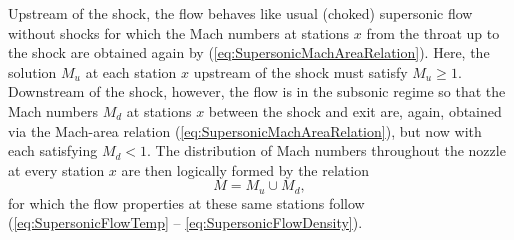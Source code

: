 \documentclass[11pt,dvipsnames]{thesis}
\begin{document}
Upstream of the shock, the flow behaves like usual (choked) supersonic flow without shocks for which the Mach numbers at stations $x$ from the throat up to the shock are obtained again by (\ref{eq:SupersonicMachAreaRelation}). Here, the solution $M_u$ at each station $x$ upstream of the shock must satisfy $M_u \geqslant 1$. Downstream of the shock, however, the flow is in the subsonic regime so that the Mach numbers $M_d$ at stations $x$ between the shock and exit are, again, obtained via the Mach-area relation (\ref{eq:SupersonicMachAreaRelation}), but now with each satisfying $M_d < 1$.
The distribution of Mach numbers throughout the nozzle at every station $x$ are then logically formed by the relation
\begin{equation}
M = M_u \cup M_d,
\end{equation}
for which the flow properties at these same stations follow (\ref{eq:SupersonicFlowTemp} -- \ref{eq:SupersonicFlowDensity}).
\end{document}

